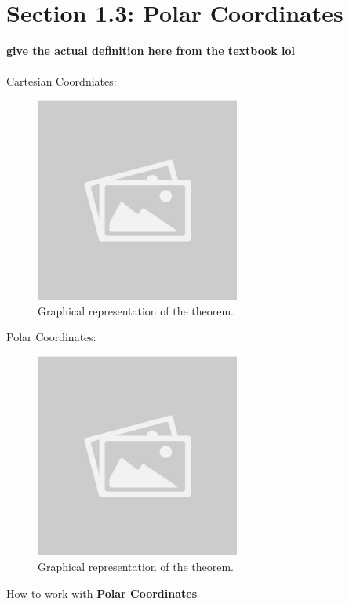 \documentclass{article}
\begin{document}
\section*{Section 1.3: Polar Coordinates}
\begin{definitionbox}
    \textbf{give the actual definition here from the textbook lol} \\
    \\
    Cartesian Coordniates:
    \begin{figure}[H]
        \centering
        \includegraphics[width=0.6\textwidth]{sample_image1.jpg}
        \caption{Graphical representation of the theorem.}
        \label{fig:sample_image1}
    \end{figure}
    Polar Coordinates:
    \begin{figure}[H]
        \centering
        \includegraphics[width=0.6\textwidth]{sample_image1.jpg}
        \caption{Graphical representation of the theorem.}
        \label{fig:sample_image1}
    \end{figure}
    How to work with \textbf{Polar Coordinates}

\end{definitionbox}
\end{document}
